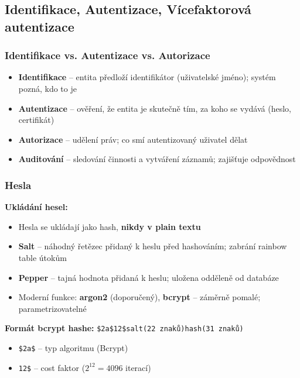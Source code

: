 \subsection{Identifikace, Autentizace, Vícefaktorová autentizace}

\subsubsection{Identifikace vs. Autentizace vs. Autorizace}

\begin{itemize}
  \item \textbf{Identifikace} -- entita předloží identifikátor (uživatelské jméno); systém pozná, kdo to je
  \item \textbf{Autentizace} -- ověření, že entita je skutečně tím, za koho se vydává (heslo, certifikát)
  \item \textbf{Autorizace} -- udělení práv; co smí autentizovaný uživatel dělat
  \item \textbf{Auditování} -- sledování činnosti a vytváření záznamů; zajišťuje odpovědnost
\end{itemize}

\subsubsection{Hesla}

\textbf{Ukládání hesel:}
\begin{itemize}
  \item Hesla se ukládají jako hash, \textbf{nikdy v plain textu}
  \item \textbf{Salt} -- náhodný řetězec přidaný k heslu před hashováním; zabrání rainbow table útokům
  \item \textbf{Pepper} -- tajná hodnota přidaná k heslu; uložena odděleně od databáze
  \item Moderní funkce: \textbf{argon2} (doporučený), \textbf{bcrypt} -- záměrně pomalé; parametrizovatelné
\end{itemize}

\textbf{Formát bcrypt hashe:} \texttt{\$2a\$12\$salt(22 znaků)hash(31 znaků)}
\begin{itemize}
  \item \texttt{\$2a\$} -- typ algoritmu (Bcrypt)
  \item \texttt{12\$} -- cost faktor ($2^{12} = 4096$ iterací)
\end{itemize}

